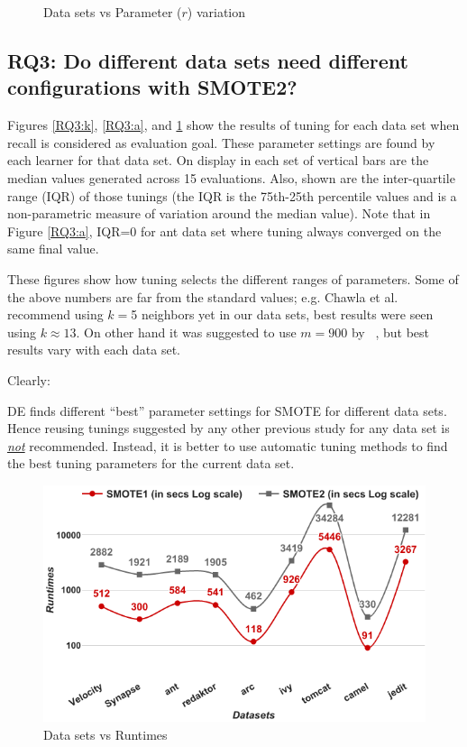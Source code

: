 \begin{figure}[!t]
\begin{minipage}{.33\textwidth}
        \caption{Data sets vs Parameter ($r$) variation}
        \label{RQ3:b}
    \end{minipage}
\end{figure}

\subsection{\textbf{RQ3: Do different data sets
      need different configurations with SMOTE2?}}

Figures \ref{RQ3:k}, \ref{RQ3:a}, and \ref{RQ3:b} show the results of tuning for each data set when recall is considered as evaluation goal. These parameter settings are found by each learner for that data set.
On display in each set of vertical bars are
the median values generated across 15 evaluations.
Also, shown are
the inter-quartile range (IQR) of those tunings (the IQR is the 75th-25th percentile values and is a non-parametric measure of variation
around the median value). Note that in Figure \ref{RQ3:a}, IQR=0 for  ant data set where tuning
          always converged on the same final value.

  These figures
show how tuning selects the different ranges  of
parameters. 
Some of the above numbers are far from the standard values; e.g. Chawla et al.~\cite{chawla2002smote} recommend using $k=$5 neighbors yet in our data sets, best results were seen using $k \approx 13$. On other hand it was suggested to use $m=900$ by ~\cite{pears2014synthetic}, but best results vary with each data set.

Clearly:
\begin{lesson1}
    DE finds different ``best'' parameter settings for SMOTE for different data sets. Hence reusing tunings  suggested  by  any other  previous study  for any data set is \underline{{\em not}} recommended. Instead,  it is better to
      use  automatic  tuning  methods  to find the best tuning parameters for the current data set.
\end{lesson1}

\begin{figure}[!b]
  \captionsetup{justification=centering}
  \includegraphics[width=\linewidth]{./fig/runtimes.png}
  \caption{Data sets vs Runtimes}
  \label{runtime}
\end{figure} 

